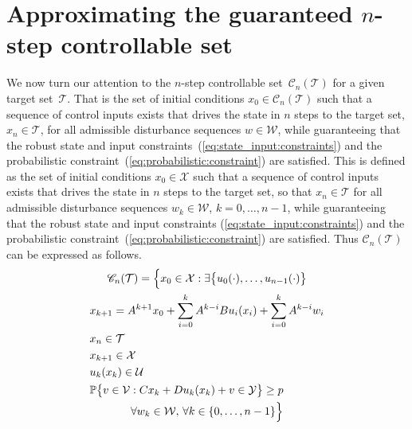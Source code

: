 \documentclass{ifacconf}
\providecommand{\C}{\mathscr C}
\providecommand{\W}{\mathcal W}
\providecommand{\V}{\mathcal V}
\providecommand{\X}{\mathcal X}
\providecommand{\Y}{\mathcal Y}
\providecommand{\U}{\mathcal U}
\providecommand{\T}{\mathcal T}
\providecommand{\PP}{\mathbb P}
\begin{document}
\section{Approximating the guaranteed $n$-step controllable set}\label{ssec:approximating:n:step}
%
We now turn our attention to the $n$-step controllable set~$\C_n(\T)$ for a given target set~$\T$.
%
That is the set of initial conditions $x_0\in\C_n(\T)$ such that a sequence of control inputs exists that drives the state in $n$ steps to the target set, $x_n\in\T$, for all admissible disturbance sequences 
$w\in\W$, while guaranteeing that the robust state and input constraints~(\ref{eq:state_input:constraints}) and the probabilistic constraint~(\ref{eq:probabilistic:constraint}) are satisfied.
%
This is defined as the set of initial conditions $x_0\in\X$ such that a sequence of control inputs exists that drives the state in $n$ steps to the target set, so that $x_n\in\T$ for all admissible disturbance sequences 
$w_k\in\W$, $k=0,\ldots,n-1$, while guaranteeing that the robust state and input constraints 
(\ref{eq:state_input:constraints}) and the probabilistic constraint~(\ref{eq:probabilistic:constraint}) are satisfied.
%
Thus $\C_n(\T)$ can be expressed as follows.
%
\begin{multline*}
\C_n(\T) = \Bigl\{x_0\in\X: \exists \bigl\{u_0(\cdot),\ldots,u_{n-1}(\cdot)\bigr\}\\
\begin{aligned}
&x_{k+1} = A^{k+1} x_0 + \sum_{i=0}^{k} A^{k-i}B u_{i}(x_{i}) + \sum_{i=0}^{k} A^{k-i} w_{i}\\
&x_n\in\T\\
&x_{k+1}\in\X\\
&u_k(x_k)\in\U\\
&\PP\bigl\{v\in\V : Cx_k + Du_k(x_k) +v \in\Y\bigr\}\geq p
\end{aligned}\\
\forall w_k\in\W,\, \forall k\in\{ 0, \ldots , n-1\} \Bigr\}	
\end{multline*}
\end{document}
